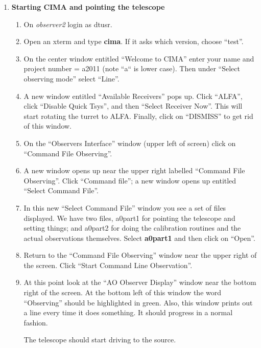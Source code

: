 \begin{enumerate}

\item {\bf Starting CIMA and pointing the telescope} \begin{enumerate}

\item On {\it observer2} login as dtusr.

\item Open an xterm and type {\bf cima}. If it asks which version, choose ``test''.

\item On the center window entitled ``Welcome to CIMA'' enter your name
and project number = a2011 (note ``a`` is lower case).  Then under
``Select observing mode'' select ``Line''.

\item A new window entitled ``Available Receivers'' pops up.  Click
``ALFA'', click ``Disable Quick Tsys'', and then ``Select Receiver
Now''.  This will start rotating the turret to ALFA.  Finally, click on
``DISMISS'' to get rid of this window.

\item On the ``Observers Interface'' window (upper left of screen) click
on ``Command File Observing''.  

\item A new window opens up near the upper right labelled ``Command
File Observing''.  Click ``Command file''; a new window opens up
entitled ``Select Command File''.  

\item In this new ``Select Command File'' window you see a set of files
displayed.  We have two files, a0part1 for pointing the telescope and
setting things; and a0part2 for doing the calibration routines and the
actual observations themselves.  Select {\bf a0part1} and then click on
``Open''. 

\item Return to the ``Command File Observing'' window near the upper
right of the screen. Click ``Start Command Line Observation''.

\item At this point look at the ``AO Observer Display'' window near the
bottom right of the screen.  At the bottom left of this window the word
``Observing'' should be highlighted in green.  Also, this window prints
out a line every time it does something.  It should progress in a normal
fashion.  

The telescope should start driving to the source. 


\end{enumerate}
\end{enumerate}
